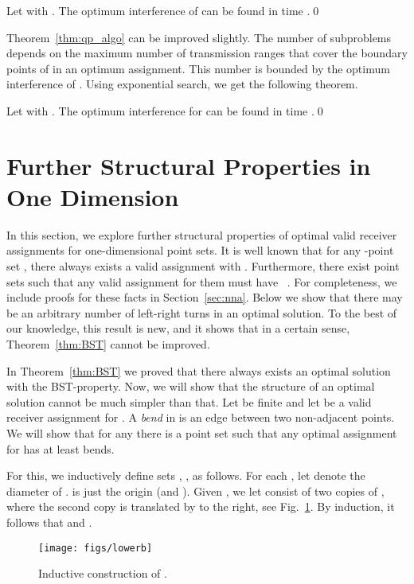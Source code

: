 \documentclass[envcountsect,envcountsame,runningheads,a4paper]{llncs}
\begin{document}
\begin{theorem}\label{thm:qp_algo}
Let  with . The optimum interference of  can be
found in time .\qed
\end{theorem}

Theorem~\ref{thm:qp_algo} can be improved slightly. The number of subproblems
depends on the maximum number of transmission ranges that cover the boundary points
of  in an optimum assignment. This number is bounded by the optimum
interference of .  Using exponential search, we get the following
theorem.
\begin{theorem}
Let  with . The optimum
interference  for  can be found in time
.\qed
\end{theorem}

\section{Further Structural Properties in One Dimension}\label{sec:further}

In this section, we explore further structural properties of
optimal valid receiver assignments for one-dimensional point sets.
It is well known that for any -point set , there always exists a valid assignment  with
. Furthermore, there exist point sets such that
any valid assignment  for them must have ~\cite{RickenbachWaZo09}.
For completeness, we include proofs for these facts in Section~\ref{sec:nna}. 
Below we show that there may be an arbitrary number
of left-right turns in an optimal solution. To the best of our knowledge, this result is new, and
it shows that in a certain sense, Theorem~\ref{thm:BST} cannot be improved.


In Theorem~\ref{thm:BST} we proved that there always exists an
optimal solution with the BST-property. Now, we will
show that the structure of an optimal solution cannot
be much simpler than that. Let  be finite
and let  be a valid receiver assignment for . A \emph{bend} in 
is an edge between two non-adjacent points. We will show that
for any  there is a point set  such that any optimal
assignment for  has at least  bends.

For this, we inductively define sets , ,  as follows.
For each , let  denote the diameter of .
 is just the origin (and ). Given , we let 
consist of two copies of , where the second copy is translated
by  to the right, see Fig.~\ref{fig:lowerb}. By induction,
it follows that
 and .

\begin{figure}
\centering
\texttt{[image: figs/lowerb]}
\caption{Inductive construction of .}
\label{fig:lowerb}
\end{figure}
\end{document}
